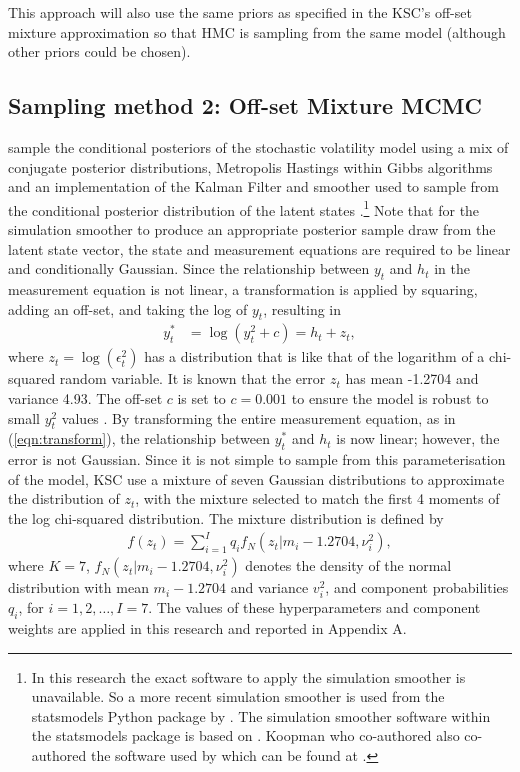 \documentclass[12pt, a4paper]{article}
\begin{document}
        This approach will also use the same priors as specified in the KSC's off-set mixture approximation so that HMC is sampling from the same model (although other priors could be chosen). 

    
    \subsection{Sampling method 2: Off-set Mixture MCMC}
        \citet{kim1998stochastic} sample the conditional posteriors of the stochastic volatility model using a mix of conjugate posterior distributions, Metropolis Hastings \citep{metropolis1953equation, hastings1970monte} within Gibbs \citep{geman1984stochastic} algorithms and an implementation of the Kalman Filter \citep{kalman1960new} and smoother used to sample from the conditional posterior distribution of the latent states \citep{dejong1995}.\footnote{In this research the exact software to apply the simulation smoother is unavailable. So a more recent simulation smoother is used from the statsmodels Python package by \citet{seabold2010statsmodels}. The simulation smoother software within the statsmodels package is based on \citet{durbin2012time}. Koopman who co-authored \citet{durbin2012time} also co-authored the software used by \citet{kim1998stochastic} which can be found at \citet{koopman1996ssfpack}.} Note that for the simulation smoother to produce an appropriate posterior sample draw from the latent state vector, the state and measurement equations are required to be linear and conditionally Gaussian. Since the relationship between $y_t$ and $h_t$ in the measurement equation is not linear, a transformation is applied by squaring, adding an off-set, and taking the log of $y_t$, resulting in
        \begin{align}
        y_t^{*} &= \log(y_t^2 + c) = h_t + z_t, \label{eqn:transform}
        \end{align}
        where $z_t = \log(\epsilon_t^2)$ has a distribution that is like that of the logarithm of a chi-squared random variable. It is known that the error $z_t$ has mean -1.2704 and variance 4.93. The off-set $c$ is set to $c=0.001$ to ensure the model is robust to small $y_t^2$ values \citep{fuller1996introduction}. By transforming the entire measurement equation, as in (\ref{eqn:transform}), the relationship between $y_t^{*}$ and $h_t$ is now linear; however, the error is not Gaussian. Since it is not simple to sample from this parameterisation of the model, KSC use a mixture of seven Gaussian distributions to approximate the distribution of $z_t$, with the mixture selected to match the first 4 moments of the log chi-squared distribution. The mixture distribution is defined by
        \begin{align}
        f(z_t) = \sum_{i=1}^{I} q_if_N(z_t|m_i-1.2704, \nu_i^2),
        \end{align}
        where $K=7$, $f_N(z_t|m_i-1.2704, \nu_i^2)$ denotes the density of the normal distribution with mean $m_i-1.2704$ and variance $v_i^2$, and  component probabilities $q_i$, for $i=1,2,\ldots, I=7$.  The values of these hyperparameters and component weights are applied in this research and reported in Appendix A.
\end{document}
